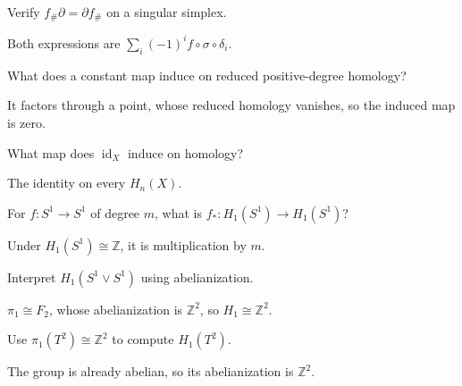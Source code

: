 \begin{problem}\label{prob:viii17-11}
Verify \(f_\#\partial=\partial f_\#\) on a singular simplex.
\end{problem}
\begin{solution}
Both expressions are \(\sum_i(-1)^i f\circ\sigma\circ\delta_i\).
\end{solution}

\begin{problem}\label{prob:viii17-12}
What does a constant map induce on reduced positive-degree homology?
\end{problem}
\begin{solution}
It factors through a point, whose reduced homology vanishes, so the induced map is zero.
\end{solution}

\begin{problem}\label{prob:viii17-13}
What map does \(\operatorname{id}_X\) induce on homology?
\end{problem}
\begin{solution}
The identity on every \(H_n(X)\).
\end{solution}

\begin{problem}\label{prob:viii17-14}
For \(f:S^1\to S^1\) of degree \(m\), what is \(f_*:H_1(S^1)\to H_1(S^1)\)?
\end{problem}
\begin{solution}
Under \(H_1(S^1)\cong\mathbb Z\), it is multiplication by \(m\).
\end{solution}

\begin{problem}\label{prob:viii17-15}
Interpret \(H_1(S^1\vee S^1)\) using abelianization.
\end{problem}
\begin{solution}
\(\pi_1\cong F_2\), whose abelianization is \(\mathbb Z^2\), so \(H_1\cong\mathbb Z^2\).
\end{solution}

\begin{problem}\label{prob:viii17-16}
Use \(\pi_1(T^2)\cong\mathbb Z^2\) to compute \(H_1(T^2)\).
\end{problem}
\begin{solution}
The group is already abelian, so its abelianization is \(\mathbb Z^2\).
\end{solution}


